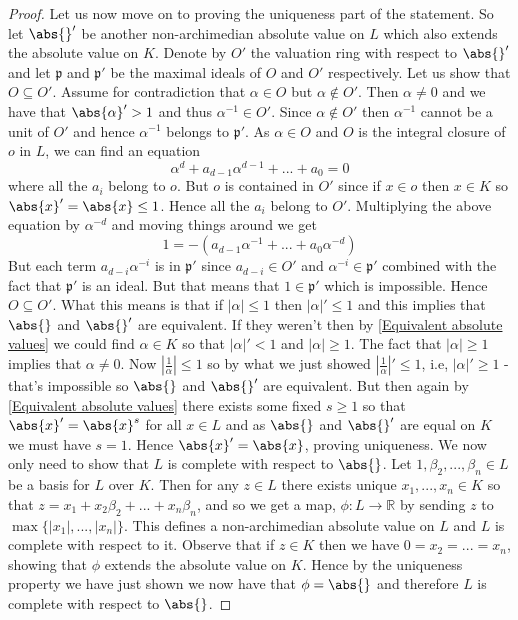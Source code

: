 \documentclass{article}
\newcommand{\mfrak}[1]{\mathfrak{#1}}
\newcommand{\mbb}[1]{\mathbb{#1}}
\numberwithin{equation}{section}
\begin{document}
\begin{proof}
    Let us now move on to proving the uniqueness part of the statement. So let $\abs{}'$ be another non-archimedian absolute value on $L$ which also extends the absolute value on $K$. Denote by $O'$ the valuation ring with respect to $\abs{}'$ and let $\mfrak p$ and $\mfrak p'$ be the maximal ideals of $O$ and $O'$ respectively. Let us show that $O \subseteq O'$. Assume for contradiction that $\alpha \in O$ but $\alpha \notin O'$. Then $\alpha \neq 0$ and we have that $\abs{\alpha}' > 1$ and thus $\alpha^{-1} \in O'$. Since $\alpha \notin O'$ then $\alpha^{-1}$ cannot be a unit of $O'$ and hence $\alpha^{-1}$ belongs to $\mfrak p'$. As $\alpha \in O$ and $O$ is the integral closure of $o$ in $L$, we can find an equation
    $$\alpha^d + a_{d-1}\alpha^{d-1} + ... + a_0 = 0$$
    where all the $a_i$ belong to $o$. But $o$ is contained in $O'$ since if $x \in o$ then $x \in K$ so $\abs{x}' = \abs{x} \leq 1$. Hence all the $a_i$ belong to $O'$. Multiplying the above equation by $\alpha^{-d}$ and moving things around we get $$1 = -(a_{d-1}\alpha^{-1} + ... + a_0\alpha^{-d})$$
    But each term $a_{d-i} \alpha^{-i}$ is in $\mfrak p'$ since $a_{d-i} \in O'$ and $\alpha^{-i} \in \mfrak p'$ combined with the fact that $\mfrak p'$ is an ideal. But that means that $1 \in \mfrak p'$ which is impossible. Hence $O \subseteq O'$. What this means is that if $|\alpha| \leq 1$ then $|\alpha|' \leq 1$ and this implies that $\abs{}$ and $\abs{}'$ are equivalent. If they weren't then by \cref{Equivalent absolute values} we could find $\alpha \in K$ so that $|\alpha|' < 1$ and $|\alpha| \geq 1$. The fact that $|\alpha| \geq 1$ implies that $\alpha \neq 0$. Now $|\frac{1}{\alpha}| \leq 1$ so by what we just showed $|\frac{1}{\alpha}|' \leq 1$, i.e, $|\alpha|' \geq 1$ - that's impossible so $\abs{}$ and $\abs{}'$ are equivalent. But then again by \cref{Equivalent absolute values} there exists some fixed $s \geq 1$ so that $\abs{x}' = \abs{x}^s$ for all $x \in L$ and as $\abs{}$ and $\abs{}'$ are equal on $K$ we must have $s = 1$. Hence $\abs{x}' = \abs{x}$, proving uniqueness. We now only need to show that $L$ is complete with respect to $\abs{}$. Let $1, \beta_2, ..., \beta_{n} \in L$ be a basis for $L$ over $K$. Then for any $z \in L$ there exists unique $x_1, ..., x_n \in K$ so that $z = x_1 + x_2 \beta_2 + ... + x_{n}\beta_{n}$, and so we get a map, $\phi : L \to \mbb R$ by sending $z$ to $\max \{|x_1|, ...,|x_n|\}$. This defines a non-archimedian absolute value on $L$ and $L$ is complete with respect to it.
    Observe that if $z \in K$ then we have $0 = x_2 = ... = x_n$, showing that $\phi$ extends the absolute value on $K$. Hence by the uniqueness property we have just shown we now have that $\phi = \abs{}$ and therefore $L$ is complete with respect to $\abs{}$.


\end{proof}
\end{document}

